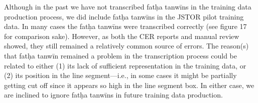 Although in the past we have not transcribed fatḥa tanwīns in the training data
production process, we did include fatḥa tanwīns in the JSTOR pilot training
data. In many cases the fatḥa tanwīns were transcribed correctly (see figure 17
for comparison sake). However, as both the CER reports and manual review
showed, they still remained a relatively common source of errors.  The
reason(s) that fatḥa tanwīn remained a problem in the transcription process
could be related to either (1) its lack of sufficient representation in the
training data, or (2) its position in the line segment—i.e., in some cases it
might be partially getting cut off since it appears so high in the line segment
box. In either case, we are inclined to ignore fatḥa tanwīns in future training
data production. 

 \begin{figure}[h]

\end{figure}
